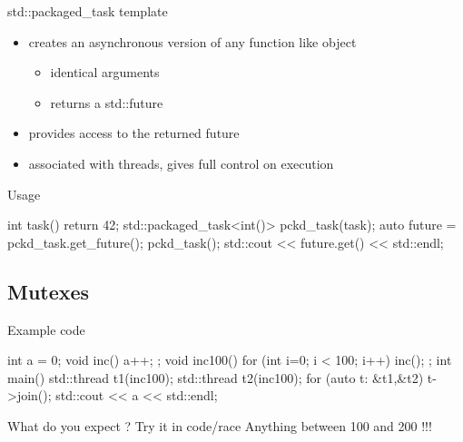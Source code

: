 \begin{frame}[fragile]
  \begin{block}{std::packaged\_task template}
    \begin{itemize}
    \item creates an asynchronous version of any function like object
      \begin{itemize}
      \item identical arguments
      \item returns a std::future
      \end{itemize}
    \item provides access to the returned future
    \item associated with threads, gives full control on execution
    \end{itemize}
  \end{block}
  \pause
  \begin{exampleblock}{Usage}
    \begin{cppcode*}{}
      int task() { return 42; }
      std::packaged_task<int()> pckd_task(task);
      auto future = pckd_task.get_future();
      pckd_task();
      std::cout << future.get() << std::endl;
    \end{cppcode*}
  \end{exampleblock}
\end{frame}

\subsection[mutex]{Mutexes}

\begin{frame}[fragile]
  \begin{exampleblock}{Example code}
    \begin{cppcode*}{}
      int a = 0;
      void inc() { a++; };
      void inc100() {
        for (int i=0; i < 100; i++) inc();
      };
      int main() {
        std::thread t1(inc100);
        std::thread t2(inc100);
        for (auto t: {&t1,&t2}) t->join();
        std::cout << a << std::endl;
      }
    \end{cppcode*}
  \end{exampleblock}
  \pause
  \begin{block}{What do you expect ? Try it in code/race}
    \pause
    Anything between 100 and 200 !!!
  \end{block}
\end{frame}

